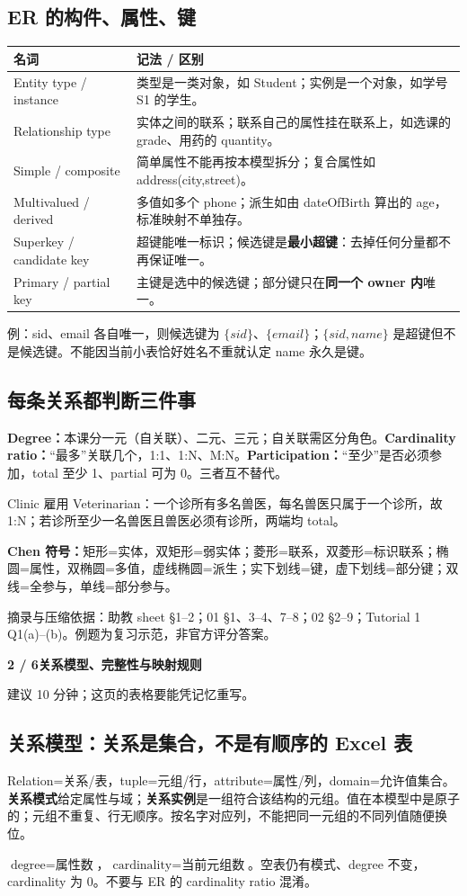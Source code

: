 \documentclass[11pt,a4paper]{article}
\newcommand{\stitle}[2]{{\sffamily\LARGE\bfseries\color{CUHKPurple}#1}\par{\small\color{Muted}#2}\par\vspace{3mm}}
\newcommand{\src}[1]{\par\vfill{\footnotesize\color{Muted}摘录与压缩依据：#1。例题为复习示范，非官方评分答案。}}
\begin{document}
\subsection{ER 的构件、属性、键}
\begin{tabularx}{\linewidth}{@{}lX@{}}
\toprule 名词 & 记法 / 区别 \\
\midrule
Entity type / instance & 类型是一类对象，如 Student；实例是一个对象，如学号 S1 的学生。\\
Relationship type & 实体之间的联系；联系自己的属性挂在联系上，如选课的 grade、用药的 quantity。\\
Simple / composite & 简单属性不能再按本模型拆分；复合属性如 address(city,street)。\\
Multivalued / derived & 多值如多个 phone；派生如由 dateOfBirth 算出的 age，标准映射不单独存。\\
Superkey / candidate key & 超键能唯一标识；候选键是\textbf{最小超键}：去掉任何分量都不再保证唯一。\\
Primary / partial key & 主键是选中的候选键；部分键只在\textbf{同一个 owner 内}唯一。\\
\bottomrule
\end{tabularx}
例：sid、email 各自唯一，则候选键为 $\{sid\}$、$\{email\}$；$\{sid,name\}$ 是超键但不是候选键。不能因当前小表恰好姓名不重就认定 name 永久是键。

\subsection{每条关系都判断三件事}
\textbf{Degree：}本课分一元（自关联）、二元、三元；自关联需区分角色。\textbf{Cardinality ratio：}“最多”关联几个，1:1、1:N、M:N。\textbf{Participation：}“至少”是否必须参加，total 至少 1、partial 可为 0。三者互不替代。\par
Clinic 雇用 Veterinarian：一个诊所有多名兽医，每名兽医只属于一个诊所，故 1:N；若诊所至少一名兽医且兽医必须有诊所，两端均 total。\par
\textbf{Chen 符号：}矩形=实体，双矩形=弱实体；菱形=联系，双菱形=标识联系；椭圆=属性，双椭圆=多值，虚线椭圆=派生；实下划线=键，虚下划线=部分键；双线=全参与，单线=部分参与。
\src{助教 sheet §1--2；01 §1、3--4、7--8；02 §2--9；Tutorial 1 Q1(a)--(b)}

\clearpage
\stitle{2 / 6\quad 关系模型、完整性与映射规则}{建议 10 分钟；这页的表格要能凭记忆重写。}
\subsection{关系模型：关系是集合，不是有顺序的 Excel 表}
Relation=关系/表，tuple=元组/行，attribute=属性/列，domain=允许值集合。\textbf{关系模式}给定属性与域；\textbf{关系实例}是一组符合该结构的元组。值在本模型中是原子的；元组不重复、行无顺序。按名字对应列，不能把同一元组的不同列值随便换位。\par
$\text{degree}=\text{属性数}$，$\text{cardinality}=\text{当前元组数}$。空表仍有模式、degree 不变，cardinality 为 0。不要与 ER 的 cardinality ratio 混淆。
\end{document}

